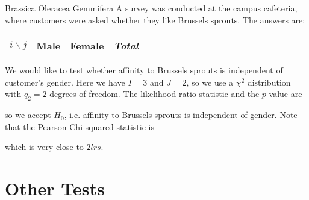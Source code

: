 \begin{ex}{Brassica Oleracea Gemmifera} A survey was conducted at the campus cafeteria, where customers were asked whether
 they like Brussels sprouts. The answers are:
 \begin{center}
 \begin{tabular}{|c|c c c c||c c|}
 \hline
   $i\backslash j$  & \multicolumn{2}{c}{Male}& \multicolumn{2}{c||}{Female} &\multicolumn{2}{c|}{\emph{Total}} \\ \hline
 \hline
 \end{tabular}
 \end{center} We would like to test whether affinity to Brussels sprouts
 is independent of customer's gender.
%
 Here we have $I=3$ and $J=2$, so we use a $\chi^2$ distribution with $q_2=2$
 degrees of freedom. The likelihood ratio statistic and the $p$-value are
  
so we accept $H_0$, i.e. affinity to Brussels sprouts is independent of gender.
%
Note that the Pearson Chi-squared statistic is
  
  which is very close to $2 lrs$. \end{ex}
\section{Other Tests}
